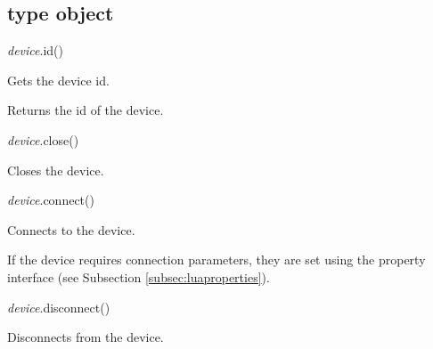 \documentclass[a4paper,12pt,twoside,extrafontsizes]{memoir}
\begin{document}
\subsection{ type object}


\begin{luafuncprototype}
\emph{device}.id()
\end{luafuncprototype}

\begin{funcdescr}
	Gets the device id.
\end{funcdescr}

\begin{funcret}
	Returns the id of the device.
\end{funcret}


\begin{luafuncprototype}
\emph{device}.close()
\end{luafuncprototype}

\begin{funcdescr}
	Closes the device.
\end{funcdescr}


\begin{luafuncprototype}
\emph{device}.connect()
\end{luafuncprototype}

\begin{funcdescr}
	Connects to the device.
\end{funcdescr}

\begin{funcremarks}
	If the device requires connection parameters, they are set using the property interface (see Subsection \ref{subsec:luaproperties}).
\end{funcremarks}


\begin{luafuncprototype}
\emph{device}.disconnect()
\end{luafuncprototype}

\begin{funcdescr}
	Disconnects from the device.
\end{funcdescr}
\end{document}
